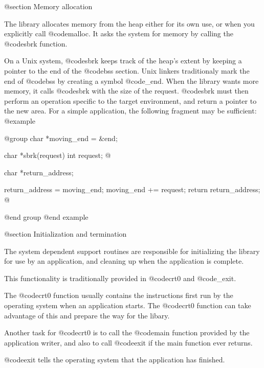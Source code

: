 @section Memory allocation

The library allocates memory from the heap either for its own use, or when
you explicitly call @code{malloc}.  It asks the system for
memory by calling the @code{sbrk} function.  

On a Unix system, @code{sbrk} keeps track of the heap's extent by keeping a
pointer to the end of the @code{bss} section.  Unix linkers
traditionaly mark the end of @code{bss} by creating a symbol
@code{_end}.  When the library wants more memory, it calls
@code{sbrk} with the size of the request.  @code{sbrk} must then
perform an operation specific to the target environment, and return a pointer
to the new area.  For a simple application, the following fragment may
be sufficient:
@example

@group
char *moving_end = &end;

char *sbrk(request)
int request;
@{
  char *return_address;

  return_address = moving_end;
  moving_end += request;
  return return_address;
@}
@end group
@end example

@section Initialization and termination

The system dependent support routines are responsible for
initializing the library for use by an application, and cleaning up
when the application is complete.

This functionality is traditionally provided in @code{crt0} and
@code{_exit}.  

The @code{crt0} function usually contains the instructions first run
by the operating system when an application starts.  The
@code{crt0} function can take advantage of this and prepare the way
for the libary.

Another task for @code{crt0} is to call the @code{main} function
provided by the application writer, and also to call @code{exit} if
the main function ever returns.

@code{exit} tells the operating system that the application has
finished.



